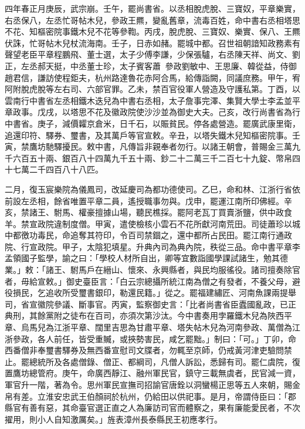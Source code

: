 \begin{pinyinscope}
 四年春正月庚辰，武宗崩。壬午，罷尚書省。以丞相脫虎脫、三寶奴，平章樂實，右丞保八，左丞忙哥帖木兒，參政王羆，變亂舊章，流毒百姓，命中書右丞相塔思不花、知樞密院事鐵木兒不花等參鞫。丙戌，脫虎脫、三寶奴、樂實、保八、王羆伏誅，忙哥帖木兒杖流海南。壬子，日赤如赭。罷城中都。召世祖朝諳知政務素有聲望老臣平章程鵬飛、董士選，太子少傅李謙，少保張驢，右丞陳天祥、尚文、劉正，左丞郝天挺，中丞董士珍，太子賓客蕭，參政劉敏中、王思廉、韓從益，侍御趙君信，謙訪使程鉅夫，杭州路達魯花赤阿合馬，給傳詣闕，同議庶務。甲午，宥阿附脫虎脫等左右司、六部官罪。乙未，禁百官役軍人營造及守護私第。丁酉，以雲南行中書省左丞相鐵木迭兒為中書右丞相，太子詹事完澤、集賢大學士李孟並平章政事。戊戌，以塔思不花及徽政院使沙沙並為御史大夫。己亥，改行尚書省為行中書省。庚子，減價糶京倉米，日千石，以賑貧民。停各處營造。罷廣武康里衛，追還印符、驛券、璽書，及其萬戶等官宣敕。辛丑，以塔失鐵木兒知樞密院事。壬寅，禁鷹坊馳驛擾民。敕中書，凡傳旨非親奉者勿行。以諸王朝會，普賜金三萬九千六百五十兩、銀百八十四萬九千五十兩、鈔二十二萬三千二百七十九錠、幣帛四十七萬二千四百八十八匹。



 二月，復玉宸樂院為儀鳳司，改延慶司為都功德使司。乙巳，命和林、江浙行省依前設左丞相，餘省唯置平章二員，遙授職事勿與。戊申，罷運江南所印佛經。辛亥，禁諸王、駙馬、權豪擅據山場，聽民樵採。罷阿老瓦丁買賣浙鹽，供中政食羊。禁宣政院違制度僧。甲寅，遣使檢核小雲石不花所獻河南荒田。司徒蕭珍以城中都徼功毒民，命追奪其符印，令百司禁錮之，還中都所占民田。罷江南行通政院、行宣政院。甲子，太陰犯填星。升典內司為典內院，秩從三品。命中書平章李孟領國子監學，諭之曰：「學校人材所自出，卿等宜數詣國學課試諸生，勉其德業。」敕：「諸王、駙馬戶在縉山、懷來、永興縣者，與民均服徭役。諸司擅奏除官者，毋給宣敕。」御史臺臣言：「白云宗總攝所統江南為僧之有發者，不養父母，避役損民，乞追收所受璽書銀印，勒還民籍。」從之。罷福建繡匠、河南魚課兩提舉司，省宣徽院參議、斷事官。丙寅，監察御史言：「比者尚書省臣蠹國亂政，已正典刑，其餘黨附之徒布在百司，亦須次第沙汰。今中書奏用孛羅鐵木兒為陜西平章、烏馬兒為江浙平章、闊里吉思為甘肅平章、塔失帖木兒為河南參政、萬僧為江浙參政，各人前任，皆受重贓，或挾勢害民，咸乞罷黜。」制曰：「可。」丁卯，命西番僧非奉璽書驛券及無西番宣慰司文牒者，勿輒至京師，仍戒黃河津吏驗問禁止。罷總統所及各處僧錄、僧正、都綱司，凡僧人訴訟，悉歸有司。罷仁虞院，復置鷹坊總管府。庚午，命廣西靜江、融州軍民官，鎮守三載無虞者，民官減一資，軍官升一階，著為令。思州軍民宣撫司招諭官唐銓以洞蠻楊正思等五人來朝，賜金帛有差。立淮安忠武王伯顏祠於杭州，仍給田以供祀事。是月，帝謂侍臣曰：「郡縣官有善有惡，其命臺官選正直之人為廉訪司官而體察之，果有廉能愛民者，不次擢用，則小人自知激厲矣。」旌表漳州長泰縣民王初應孝行。




\end{pinyinscope}
